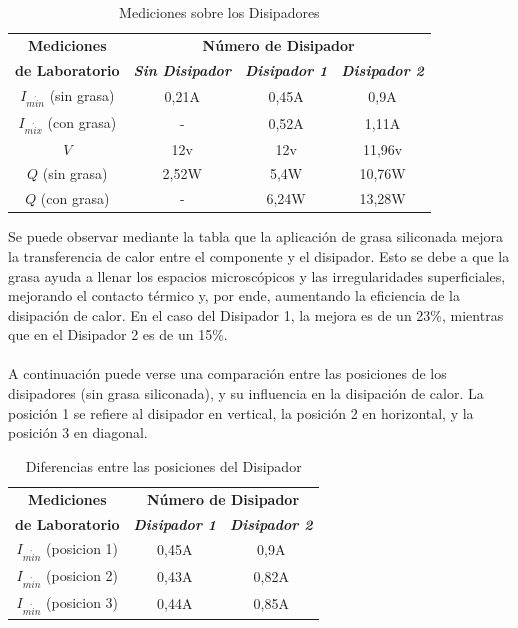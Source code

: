\documentclass[conference]{IEEEtran}
\begin{document}
\begin{table}[htbp]
    \caption{Mediciones sobre los Disipadores}
    \begin{center}
    \begin{tabular}{|c|c|c|c|}
    \hline
    \textbf{Mediciones} & \multicolumn{3}{|c|}{\textbf{Número de Disipador}} \\
    \cline{2-4} 
    \textbf{de Laboratorio} & \textbf{\textit{Sin Disipador}} & \textbf{\textit{Disipador 1}} & \textbf{\textit{Disipador 2}} \\
    \hline
    $I_{m\acute{i}n}$ (sin grasa) & 0,21A & 0,45A & 0,9A \\
    \hline
    $I_{m\acute{i}x}$ (con grasa) & - & 0,52A & 1,11A \\
    \hline
    $V$ & 12v & 12v & 11,96v \\
    \hline
    $Q$ (sin grasa) & 2,52W & 5,4W & 10,76W \\
    \hline
    $Q$ (con grasa) & - & 6,24W & 13,28W \\
    \hline
    \end{tabular}
    \label{tab1}
    \end{center}
    \end{table}

    Se puede observar mediante la tabla que la aplicación de grasa siliconada mejora la transferencia de calor entre el 
    componente y el disipador. Esto se debe a que la grasa ayuda a llenar los espacios microscópicos y las irregularidades 
    superficiales, mejorando el contacto térmico y, por ende, aumentando la eficiencia de la disipación de calor. En el caso
    del Disipador 1, la mejora es de un 23\%, mientras que en el Disipador 2 es de un 15\%.\\ \\
    A continuación puede verse una comparación entre las posiciones de los disipadores (sin grasa siliconada), y su 
    influencia en la disipación de calor. La posición 1 se refiere al disipador en vertical, la posición 2 en 
    horizontal, y la posición 3 en diagonal.

    \begin{table}[htbp]
        \caption{Diferencias entre las posiciones del Disipador}
        \begin{center}
        \begin{tabular}{|c|c|c|}
        \hline
        \textbf{Mediciones} & \multicolumn{2}{c|}{\textbf{Número de Disipador}} \\
        \cline{2-3}
        \textbf{de Laboratorio} & \textbf{\textit{Disipador 1}} & \textbf{\textit{Disipador 2}} \\
        \hline
        $I_{m\acute{i}n}$ (posicion 1) & 0,45A & 0,9A \\
        \hline
        $I_{m\acute{i}n}$ (posicion 2) & 0,43A & 0,82A \\
        \hline
        $I_{m\acute{i}n}$ (posicion 3) & 0,44A & 0,85A \\
        \hline
        
        \end{tabular}
        \label{tab1}
        \end{center}
    \end{table}
\end{document}
